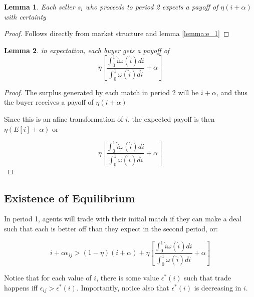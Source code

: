 \documentclass[WP]{AEA}
\newtheorem{lemma}{Lemma}
\begin{document}
\begin{lemma}

	Each seller $s_i$ who proceeds to period 2 expects a payoff of $\eta (i+\alpha)$ with certainty

\end{lemma}

\begin{proof}
	Follows directly from market structure and lemma \ref{lemma:e_1}
\end{proof}

\begin{lemma}
	in expectation, each buyer gets a payoff of 
	\begin{equation} \label{eq:E_buyer}
		\eta  \left[ \frac{\int_0^1 \hat{i} \omega(\hat{i}) di}{\int_0^1  \omega(\hat{i}) d\hat{i} } + \alpha \right]
	\end{equation}
\end{lemma}

\begin{proof}
	The surplus generated by each match in period 2 will be $i + \alpha$, and thus 
	the buyer receives a payoff of $\eta(i+\alpha)$
	
	Since this is an afine transformation of $i$, the expected payoff is then $\eta(E[i]+\alpha)$ or 



$$\eta \left[ \frac{\int_0^1 \hat{i} \omega(\hat{i}) di}{\int_0^1  \omega(\hat{i}) d\hat{i}} + \alpha \right] $$


\end{proof}


\subsection{Existence of Equilibrium}

In period 1, agents will trade with their initial match if they can make a deal such that each is better off than they expect in the second period, or:

\begin{equation} \label{eq:ec_condition_raw}
 i+\alpha \epsilon_{ij} >(1-\eta)(i+\alpha ) + \eta  \left[ \frac{\int_0^1 \hat{i} \omega(\hat{i}) di}{\int_0^1  \omega(\hat{i}) d\hat{i}} + \alpha \right] 
 \end{equation}

Notice that for each value of $i$, there is some value $\epsilon^* (i)$ such that trade happens iff $\epsilon_{ij} > \epsilon^* (i)$.  Importantly, notice also that $\epsilon^* (i)$ is decreasing in $i$.
\end{document}
